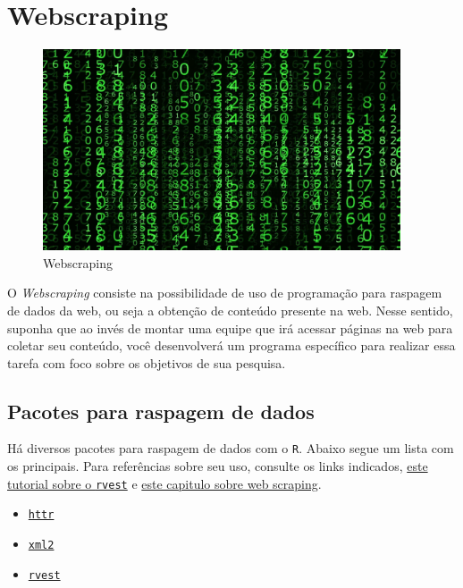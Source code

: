 \documentclass[]{book}
\providecommand{\tightlist}{%
  \setlength{\itemsep}{0pt}\setlength{\parskip}{0pt}}
\begin{document}
\hypertarget{webscraping}{%
\section{Webscraping}\label{webscraping}}

\begin{figure}
\centering
\includegraphics[width=4.16667in,height=\textheight]{images/matrix.jpg}
\caption{Webscraping}
\end{figure}

O \emph{Webscraping} consiste na possibilidade de uso de programação para raspagem de
dados da web, ou seja a obtenção de conteúdo presente na web. Nesse sentido, suponha
que ao invés de montar uma equipe que irá acessar páginas na web para coletar seu
conteúdo, você desenvolverá um programa específico para realizar essa tarefa com
foco sobre os objetivos de sua pesquisa.

\hypertarget{pacotes-para-raspagem-de-dados}{%
\subsection{Pacotes para raspagem de dados}\label{pacotes-para-raspagem-de-dados}}

Há diversos pacotes para raspagem de dados com o \texttt{R}. Abaixo segue um lista com os
principais. Para referências sobre seu uso, consulte os links indicados,
\href{https://www.datacamp.com/community/tutorials/r-web-scraping-rvest}{este tutorial sobre o \texttt{rvest}} e
\href{http://material.curso-r.com/scrape/}{este capitulo sobre web scraping}.

\begin{itemize}
\tightlist
\item
  \href{https://cran.r-project.org/web/packages/httr/vignettes/quickstart.html}{\texttt{httr}}
\item
  \href{https://cran.r-project.org/web/packages/xml2/xml2.pdf}{\texttt{xml2}}
\item
  \href{https://blog.rstudio.com/2014/11/24/rvest-easy-web-scraping-with-r/}{\texttt{rvest}}
\end{itemize}
\end{document}

